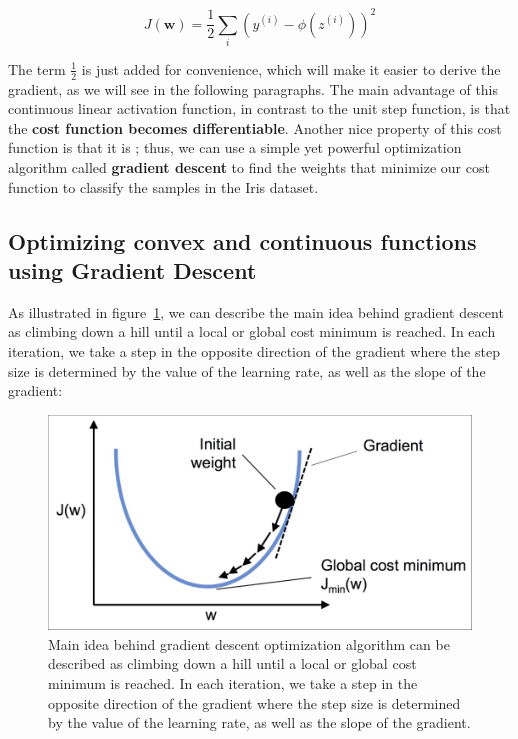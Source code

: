 \documentclass[11pt]{article}
\newcommand{\vect}[1]{\boldsymbol{#1}}
\begin{document}
    \begin{equation}
        \label{eq:ada_func_cost}
        J ( \vect{w} ) = \frac{1} {2} \sum_i \left( y^{(i)} - \phi \left( z^{(i)} \right) \right) ^2
    \end{equation}

    The term $\frac{1} {2}$ is just added for convenience, which will make it easier to derive the gradient, as we will see in the following paragraphs.
    The main advantage of this continuous linear activation function, in contrast to the unit step function, is that the \textbf{cost function becomes differentiable}.
    Another nice property of this cost function is that it is ; thus, we can use a simple yet powerful optimization algorithm called \textbf{gradient descent} to find the weights that minimize our cost function to classify the samples in the Iris dataset.

    \subsection{Optimizing convex and continuous functions using Gradient Descent} \label{subsec:grad_desc}

    As illustrated in figure~\ref{fig:grad_desc}, we can describe the main idea behind gradient descent as climbing down a hill until a local or global cost minimum is reached.
    In each iteration, we take a step in the opposite direction of the gradient where the step size is determined by the value of the learning rate, as well as the slope of the gradient:

    \begin{figure}[hbt!]
        \centering
        \includegraphics[width=1\linewidth,trim=4 4 4 4,clip]{img/grad_desc.jpg}
        \caption{Main idea behind gradient descent optimization algorithm can be described as climbing down a hill until a local or global cost minimum is reached.
        In each iteration, we take a step in the opposite direction of the gradient where the step size is determined by the value of the learning rate, as well as the slope of the gradient.}
        \label{fig:grad_desc}
    \end{figure}
\end{document}
